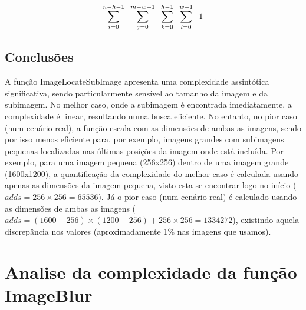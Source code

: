 \documentclass{report}
\begin{document}
\vspace{5mm}

\begin{equation}
     \sum_{i=0}^{n-h-1}  \hspace{2mm} \sum_{j=0}^{m-w-1}  \hspace{2mm} \sum_{k=0}^{h-1} \hspace{2mm}  \sum_{l=0}^{w-1} \hspace{2mm} 1 \notag
\end{equation}


\subsection{Conclusões}

A função ImageLocateSubImage apresenta uma complexidade assintótica significativa, sendo particularmente sensível ao tamanho da imagem e da subimagem. No melhor caso, onde a subimagem é encontrada imediatamente, a complexidade é linear, resultando numa busca eficiente. No entanto, no pior caso (num cenário real), a função escala com as dimensões de ambas as imagens, sendo por isso menos eficiente para, por exemplo, imagens grandes com subimagens pequenas localizadas nas últimas posições da imagem onde está incluída. Por exemplo, para uma imagem pequena (256x256) dentro de uma imagem grande (1600x1200), a quantificação da complexidade do melhor caso é calculada usando apenas as dimensões da imagem pequena, visto esta se encontrar logo no início (  \texttt{$adds = 256\times256 = 65536$}). Já o pior caso (num cenário real) é calculado usando as dimensões de ambas as imagens (\texttt{$adds = (1600-256) \times (1200-256) + 256 \times 256 = 1334272 $}), existindo aquela discrepância nos valores (aproximadamente 1\% nas imagens que usamos).


\newpage


\section{Analise da complexidade da função ImageBlur}
\end{document}
